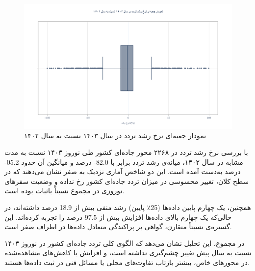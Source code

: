 \documentclass[a4paper, 12pt]{article}
\begin{document}
\begin{figure}[htbp]
    \centering
    \includegraphics[width=1\textwidth]{pics/busy-roads/growth.png}
    \caption{نمودار جعبه‌ای نرخ رشد تردد در سال ۱۴۰۳ نسبت به سال ۱۴۰۲}
\end{figure}


با بررسی نرخ رشد تردد در ۲۲۶۸ محور جاده‌ای کشور طی نوروز ۱۴۰۳ نسبت به مدت مشابه در سال ۱۴۰۲، میانه‌ی رشد تردد برابر با
82.0-
درصد و میانگین آن حدود
05.2-
درصد به‌دست آمده است. این دو شاخص آماری نزدیک به صفر نشان می‌دهند که در سطح کلان، تغییر محسوسی در میزان تردد جاده‌ای کشور رخ نداده و وضعیت سفرهای نوروزی در مجموع نسبتاً باثبات بوده است.

همچنین، یک چهارم پایین داده‌ها (25٪ پایین) رشد منفی بیش از
18.9
درصد داشته‌اند، در حالی‌که یک چهارم بالای داده‌ها افزایش بیش از
97.5
درصد
را تجربه کرده‌اند. این گستره‌ی نسبتاً متقارن، گواهی بر پراکندگی متعادل داده‌ها در اطراف صفر است.

در مجموع، این تحلیل نشان می‌دهد که الگوی کلی تردد جاده‌ای کشور در نوروز ۱۴۰۳ نسبت به سال پیش تغییر چشم‌گیری نداشته است، و افزایش یا کاهش‌های مشاهده‌شده در محورهای خاص، بیشتر بازتاب تفاوت‌های محلی یا مسائل فنی در ثبت داده‌ها هستند.
\end{document}

